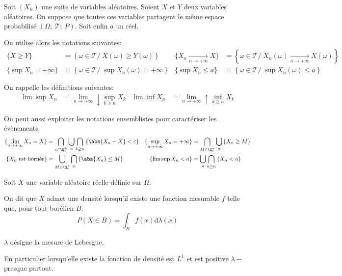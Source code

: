\begin{de}[Notations]
Soit $(X_n)$ une suite de variables aléatoires. Soient $X$ et $Y$ deux variables aléatoires. On suppose que toutes ces variables partagent le même espace probabilisé $\left (\Omega;~\mathcal{T};~P\right )$. Soit enfin $a$ un réel.

On utilise alors les notations suivantes:
\begin{align*}
\{X \geq Y \} & = \left \{\omega \in \mathcal{T}/ \; X(\omega) \geq Y(\omega) \right \} &
\{X_n \underset{n \to +\infty}{\longrightarrow} X \} & = \left \{\omega \in \mathcal{T}/ \; X_n(\omega) \underset{n \to +\infty}{\longrightarrow} X(\omega) \right \} \\
\{\sup X_n = +\infty \} & = \left \{\omega \in \mathcal{T}/ \; \sup X_n(\omega) = +\infty \right \} &
\{\sup X_n \leq a \} & = \left \{\omega \in \mathcal{T}/ \; \sup X_n(\omega) \leq a \right \} 
\end{align*}

On rappelle les définitions suivantes:
\begin{align*}
\lim \sup X_n & = \lim \limits_{n \to +\infty} \downarrow \sup \limits_{k \geq n} X_k &
\lim \inf X_n & = \lim \limits_{n \to +\infty} \uparrow \inf \limits_{k \geq n} X_k
\end{align*}

On peut aussi exploiter les notations ensemblistes pour caractériser les évènements.
\begin{align*}
\{\lim \limits_{n \to +\infty} X_n = X \} & = \bigcap \limits_{\varepsilon \in \Q^+_*} \bigcup \limits_{n} \bigcap \limits_{k \geq n} \left \{ \abs{X_n-X} < \varepsilon \right \} &
\{\sup \limits_{n \to +\infty} X_n = +\infty \} & = \bigcap \limits_{M \in \Q^+_*} \bigcup \limits_{n} \left \{ X_n \geq M \right \} \\
\{ X_n \text{ est bornée} \} & = \bigcup \limits_{M \in \Q^+_*} \bigcap \limits_{n} \left \{ \abs{X_n} \leq M \right \} &
\{ \lim \sup X_n < a \} & = \bigcup \limits_{n} \bigcap \limits_{k \geq n} \left \{ X_n < a \right \}
\end{align*}

\end{de}


\begin{de}
Soit $X$ une variable aléatoire réelle définie sur $\Omega$.

On dit que $X$ admet une densité lorsqu'il existe une fonction mesurable $f$ telle que, pour tout borélien $B$:
\[
P(X \in B) = \displaystyle{\int_B} f(x) \mathrm d \lambda(x)
\]

$\lambda$ désigne la mesure de Lebesgue.

En particulier lorsqu'elle existe la fonction de densité est $L^1$ et est positive $\lambda-$presque partout.
\end{de}

